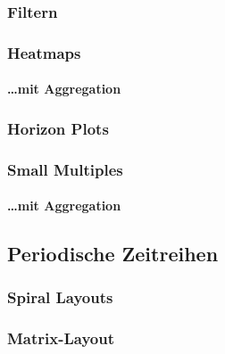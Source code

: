             \subsubsection{Filtern} %

            \subsubsection{Heatmaps} %

                \paragraph{\dots mit Aggregation} %

            \subsubsection{Horizon Plots} %

            \subsubsection{Small Multiples} %

                \paragraph{\dots mit Aggregation} %

        \subsection{Periodische Zeitreihen} %

            \subsubsection{Spiral Layouts} %

            \subsubsection{Matrix-Layout} %

